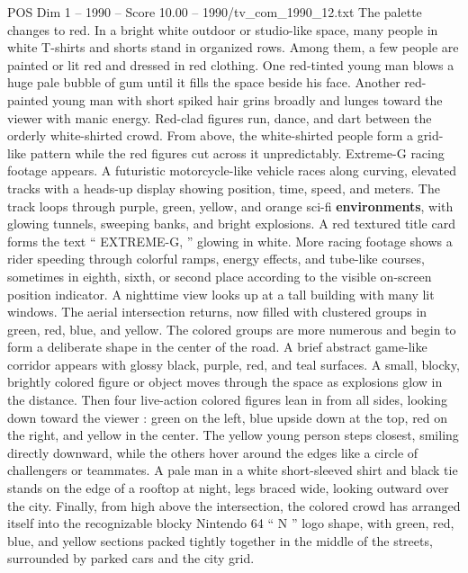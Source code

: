 \begin{textsample}{POS Dim 1 – 1990 – Score 10.00 – 1990/tv\_com\_1990\_12.txt}
The palette changes to red.
In a bright white outdoor or studio-like space, many people in white T-shirts and shorts stand in organized rows.
Among them, a few people are painted or lit red and dressed in red clothing.
One red-tinted young man blows a huge pale bubble of gum until it fills the space beside his face.
Another red-painted young man with short spiked hair grins broadly and lunges toward the viewer with manic energy.
Red-clad figures run, dance, and dart between the orderly white-shirted crowd.
From above, the white-shirted people form a grid-like pattern while the red figures cut across it unpredictably.
Extreme-G racing footage appears.
A futuristic motorcycle-like vehicle races along curving, elevated tracks with a heads-up display showing position, time, speed, and meters.
The track loops through purple, green, yellow, and orange sci-fi \textbf{environments}, with glowing tunnels, sweeping banks, and bright explosions.
A red textured title card forms the text “ EXTREME-G, ” glowing in white.
More racing footage shows a rider speeding through colorful ramps, energy effects, and tube-like courses, sometimes in eighth, sixth, or second place according to the visible on-screen position indicator.
A nighttime view looks up at a tall building with many lit windows.
The aerial intersection returns, now filled with clustered groups in green, red, blue, and yellow.
The colored groups are more numerous and begin to form a deliberate shape in the center of the road.
A brief abstract game-like corridor appears with glossy black, purple, red, and teal surfaces.
A small, blocky, brightly colored figure or object moves through the space as explosions glow in the distance.
Then four live-action colored figures lean in from all sides, looking down toward the viewer : green on the left, blue upside down at the top, red on the right, and yellow in the center.
The yellow young person steps closest, smiling directly downward, while the others hover around the edges like a circle of challengers or teammates.
A pale man in a white short-sleeved shirt and black tie stands on the edge of a rooftop at night, legs braced wide, looking outward over the city.
Finally, from high above the intersection, the colored crowd has arranged itself into the recognizable blocky Nintendo 64 “ N ” logo shape, with green, red, blue, and yellow sections packed tightly together in the middle of the streets, surrounded by parked cars and the city grid.

\end{textsample}
